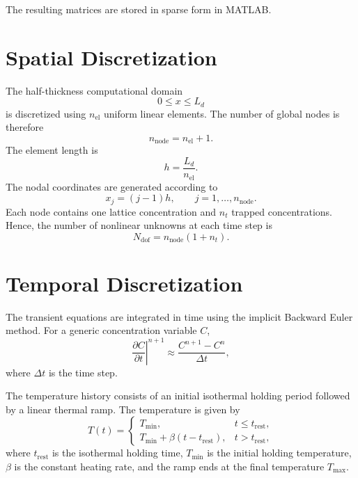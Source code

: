 \documentclass[a4paper,12pt,oneside]{report}
\begin{document}
The resulting matrices are stored in sparse form in MATLAB.

\section{Spatial Discretization}
\label{sec:ch3_spatial}

The half-thickness computational domain
\begin{equation}
0\leq x\leq L_d
\end{equation}
is discretized using $n_{\mathrm{el}}$ uniform linear elements. The number of global nodes is therefore
\begin{equation}
n_{\mathrm{node}}
=
n_{\mathrm{el}}+1.
\end{equation}
The element length is
\begin{equation}
h
=
\frac{L_d}{n_{\mathrm{el}}}.
\end{equation}
The nodal coordinates are generated according to
\begin{equation}
x_j=(j-1)h,
\qquad
j=1,\ldots,n_{\mathrm{node}}.
\end{equation}
Each node contains one lattice concentration and $n_t$ trapped concentrations. Hence, the number of nonlinear unknowns at each time step is
\begin{equation}
N_{\mathrm{dof}}
=
n_{\mathrm{node}}(1+n_t).
\end{equation}

\section{Temporal Discretization}
\label{sec:ch3_temporal}

The transient equations are integrated in time using the implicit Backward Euler method. For a generic concentration variable $C$,
\begin{equation}
\left.
\frac{\partial C}{\partial t}
\right|^{n+1}
\approx
\frac{C^{n+1}-C^n}{\Delta t},
\end{equation}
where $\Delta t$ is the time step.

The temperature history consists of an initial isothermal holding period followed by a linear thermal ramp. The temperature is given by
\begin{equation}
T(t)=
\begin{cases}
T_{\min},
&
t\leq t_{\mathrm{rest}},
\\[4pt]
T_{\min}
+
\beta(t-t_{\mathrm{rest}}),
&
t>t_{\mathrm{rest}},
\end{cases}
\label{eq:ch3_temperature}
\end{equation}
where $t_{\mathrm{rest}}$ is the isothermal holding time, $T_{\min}$ is the initial holding temperature, $\beta$ is the constant heating rate, and the ramp ends at the final temperature $T_{\max}$.
\end{document}
